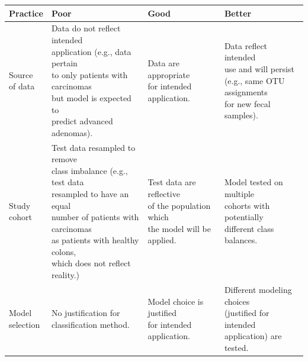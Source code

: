 \documentclass[11pt,]{article}
\begin{document}
\begin{tabular}{|l|l|l|l|}
\hline

\rowcolor{lightgray}
\textbf{Practice} & \textbf{Poor} & \textbf{Good} & \textbf{Better} \\ \hline

\makecell[l]{Source \\ of data} & \makecell[l]{Data do not reflect intended \\  application (e.g., data pertain \\ to only patients with carcinomas \\ but model is expected to \\ predict advanced adenomas).} & \makecell[l]{Data are appropriate \\ for intended application.} & \makecell[l]{Data reflect intended \\ use and will persist \\ (e.g., same OTU assignments \\ for new fecal samples).} \\ \hline

\makecell[l]{Study \\ cohort} & \makecell[l]{Test data resampled to remove \\ class imbalance (e.g., test data \\ resampled to have an equal \\ number of patients with carcinomas \\ as patients with healthy colons, \\ which does not reflect reality.)}  & \makecell[l]{Test data are reflective \\ of the population which \\ the model will be applied.} & \makecell[l]{Model tested on multiple \\ cohorts with potentially \\ different class balances.} \\ \hline

\makecell[l]{Model \\ selection} & \makecell[l]{No justification for \\ classification method.} & \makecell[l]{Model choice is justified \\ for intended application.} & \makecell[l]{Different modeling choices \\ (justified for intended \\ application) are tested.} \\ \hline


\end{tabular}
\end{document}
